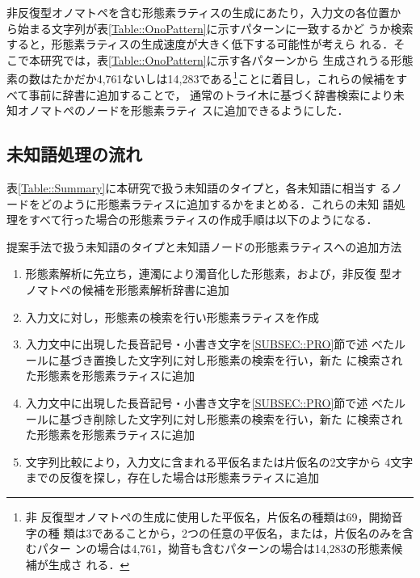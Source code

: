 \documentclass[japanese]{jnlp_1.4}
\begin{document}
   非反復型オノマトペを含む形態素ラティスの生成にあたり，入力文の各位置か
   ら始まる文字列が表\ref{Table::OnoPattern}に示すパターンに一致するかど
   うか検索すると，形態素ラティスの生成速度が大きく低下する可能性が考えら
   れる．そこで本研究では，表\ref{Table::OnoPattern}に示す各パターンから
   生成されうる形態素の数はたかだか4,761ないしは14,283である\footnote{非
   反復型オノマトペの生成に使用した平仮名，片仮名の種類は69，開拗音字の種
   類は3であることから，2つの任意の平仮名，または，片仮名のみを含むパター
   ンの場合は4,761，拗音も含むパターンの場合は14,283の形態素候補が生成さ
   れる．}ことに着目し，これらの候補をすべて事前に辞書に追加することで，
   通常のトライ木に基づく辞書検索により未知オノマトペのノードを形態素ラティ
   スに追加できるようにした．


   \subsection{未知語処理の流れ}

   表\ref{Table::Summary}に本研究で扱う未知語のタイプと，各未知語に相当す
   るノードをどのように形態素ラティスに追加するかをまとめる．これらの未知
   語処理をすべて行った場合の形態素ラティスの作成手順は以下のようになる．

   \begin{table}[b]
    \caption{提案手法で扱う未知語のタイプと未知語ノードの形態素ラティスへの追加方法}
 \label{Table::Summary}

   \end{table}

   \begin{enumerate}
    \item 形態素解析に先立ち，連濁により濁音化した形態素，および，非反復
	  型オノマトペの候補を形態素解析辞書に追加
    \item 入力文に対し，形態素の検索を行い形態素ラティスを作成
    \item 入力文中に出現した長音記号・小書き文字を\ref{SUBSEC::PRO}節で述
	  べたルールに基づき置換した文字列に対し形態素の検索を行い，新た
	  に検索された形態素を形態素ラティスに追加
    \item 入力文中に出現した長音記号・小書き文字を\ref{SUBSEC::PRO}節で述
	  べたルールに基づき削除した文字列に対し形態素の検索を行い，新た
	  に検索された形態素を形態素ラティスに追加
    \item 文字列比較により，入力文に含まれる平仮名または片仮名の2文字から
	  4文字までの反復を探し，存在した場合は形態素ラティスに追加
   \end{enumerate}   
\end{document}
